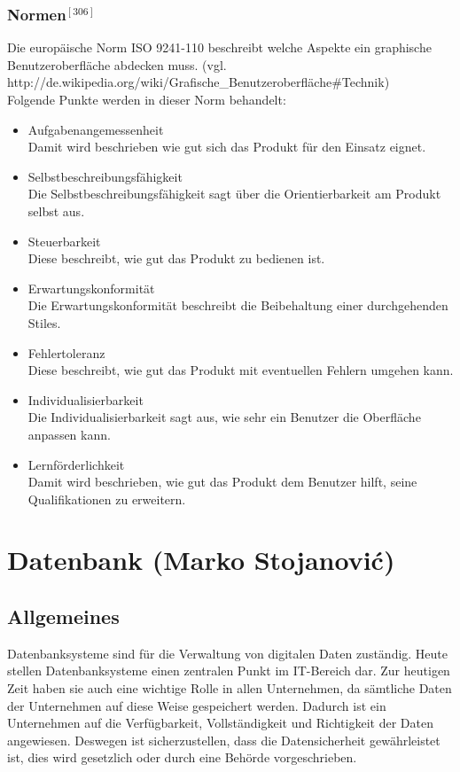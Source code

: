 \documentclass[12pt,a4paper]{report}
\begin{document}
\begin{onehalfspace}
\subsection*{Normen$^{[306]}$}
Die europäische Norm ISO 9241-110 beschreibt welche Aspekte ein graphische Benutzeroberfläche abdecken muss. (vgl. http://de.wikipedia.org/wiki/Grafische\_Benutzeroberfläche\#Technik)\\
Folgende Punkte werden in dieser Norm behandelt:
\begin{itemize}
\item Aufgabenangemessenheit\\
Damit wird beschrieben wie gut sich das Produkt für den Einsatz eignet. 
\item Selbstbeschreibungsfähigkeit\\
Die Selbstbeschreibungsfähigkeit sagt über die Orientierbarkeit am Produkt selbst aus. 
\item Steuerbarkeit\\
Diese beschreibt, wie gut das Produkt zu bedienen ist. 
\item Erwartungskonformität\\
Die Erwartungskonformität beschreibt die Beibehaltung einer durchgehenden Stiles.
\item Fehlertoleranz\\
Diese beschreibt, wie gut das Produkt mit eventuellen Fehlern umgehen kann.
\item Individualisierbarkeit\\
Die Individualisierbarkeit sagt aus, wie sehr ein Benutzer die Oberfläche anpassen kann. 
\item Lernförderlichkeit\\
Damit wird beschrieben, wie gut das Produkt dem Benutzer hilft, seine Qualifikationen zu erweitern. 
\end{itemize}
\chapter{Datenbank (Marko Stojanovi\'{c})}
\section{Allgemeines}
Datenbanksysteme sind für die Verwaltung von digitalen Daten zuständig. Heute stellen Datenbanksysteme einen zentralen Punkt im IT-Bereich dar. Zur heutigen Zeit haben sie auch eine wichtige Rolle in allen Unternehmen, da sämtliche Daten der Unternehmen auf diese Weise gespeichert werden. Dadurch ist ein Unternehmen auf die Verfügbarkeit, Vollständigkeit und Richtigkeit der Daten angewiesen. Deswegen ist sicherzustellen, dass die Datensicherheit gewährleistet ist, dies wird gesetzlich oder durch eine Behörde vorgeschrieben.\\


\end{onehalfspace}
\end{document}
